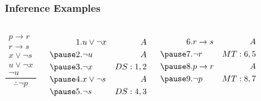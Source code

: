 \documentclass[dvipsnames]{beamer}
\begin{document}
\begin{frame}
  \frametitle{Inference Examples}

  \begin{example}
    \begin{columns}[t]
      \[
      \frac
        {
          \begin{array}{c}
            p \rightarrow r\\
            r \rightarrow s\\
            x \vee \neg s\\
            u \vee \neg x\\
            \neg u
          \end{array}
        }
        {
          \therefore \neg p
        }
      \]

      \pause
      \begin{eqnarray*}
        1. & u \vee \neg x   & A\\
        \pause
        2. & \neg u          & A\\
        \pause
        3. & \neg x          & DS:1,2\\
        \pause
        4. & x \vee \neg s   & A\\
        \pause
        5. & \neg s          & DS:4,3\\
      \end{eqnarray*}

      \pause
      \begin{eqnarray*}
        6. & r \rightarrow s & A\\
        \pause
        7. & \neg r          & MT:6,5\\
        \pause
        8. & p \rightarrow r & A\\
        \pause
        9. & \neg p          & MT:8,7\\
      \end{eqnarray*}
    \end{columns}
  \end{example}
\end{frame}
\end{document}
